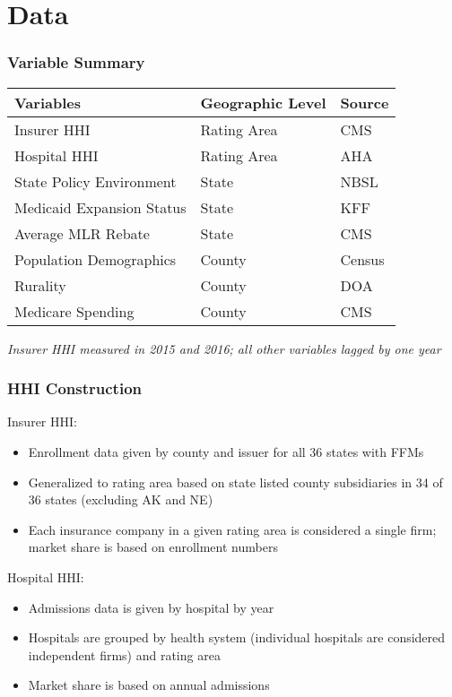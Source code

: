 \documentclass{beamer}
\begin{document}
\section[Data]{Data}

\begin{frame}
\frametitle{Variable Summary}
\begin{table}
\begin{tabular}{l l l}
\toprule
\textbf{Variables} & \textbf{Geographic Level} & \textbf{Source}\\
\midrule
Insurer HHI & Rating Area & CMS \\
Hospital HHI & Rating Area & AHA \\
State Policy Environment & State & NBSL \\
Medicaid Expansion Status & State & KFF \\
Average MLR Rebate & State & CMS \\
Population Demographics & County & Census\\
Rurality & County & DOA\\
Medicare Spending & County & CMS \\
\bottomrule
\end{tabular}
\textit{Insurer HHI measured in 2015 and 2016; all other variables lagged by one year}
\end{table}
\end{frame}

\begin{frame}
\frametitle{HHI Construction}
Insurer HHI:
\begin{itemize}
\item Enrollment data given by county and issuer for all 36 states with FFMs
\item Generalized to rating area based on state listed county subsidiaries in 34 of 36 states (excluding AK and NE)
\item Each insurance company in a given rating area is considered a single firm; market share is based on enrollment numbers
\end{itemize}
Hospital HHI:
\begin{itemize}
\item Admissions data is given by hospital by year
\item Hospitals are grouped by health system (individual hospitals are considered independent firms) and rating area
\item Market share is based on annual admissions
\end{itemize}
\end{frame}
\end{document}
